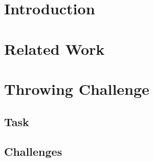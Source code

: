 \section{Introduction}


\section{Related Work}

\section{Throwing Challenge}
\subsection{Task}
\subsection{Challenges}
 


